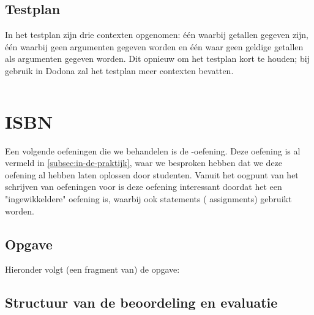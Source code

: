 \subsection{Testplan}\label{subsec:oefening-som-testplan}

In het testplan zijn drie contexten opgenomen: één waarbij getallen gegeven zijn, één waarbij geen argumenten gegeven worden en één waar geen geldige getallen als argumenten gegeven worden.
Dit opnieuw om het testplan kort te houden;
bij gebruik in Dodona zal het testplan meer contexten bevatten.

\inputminted{json}{sources/sum-plan.tson}

\section{ISBN}\label{sec:oefening-isbn}

Een volgende oefeningen die we behandelen is de \emph{}-oefening.
Deze oefening is al vermeld in \cref{subsec:in-de-praktijk}, waar we besproken hebben dat we deze oefening al hebben laten oplossen door studenten.
Vanuit het oogpunt van het schrijven van oefeningen voor \tested{} is deze oefening interessant doordat het een "ingewikkeldere" oefening is, waarbij ook statements ( assignments) gebruikt worden.

\subsection{Opgave}\label{subsec:oefeningen-isbn-opgave}

Hieronder volgt (een fragment van) de opgave:

\begin{quote}
\end{quote}


\subsection{Structuur van de beoordeling en evaluatie}\label{subsec:oefening-isbn-structuur}

